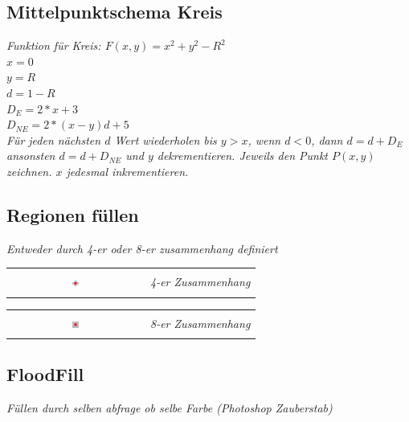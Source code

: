 \subsection{Mittelpunktschema Kreis}

\textit{Funktion für Kreis: $F(x,y) = x^2 + y^2 - R^2$}\\

$x = 0$\\
$y = R$\\
$d = 1 - R$\\
$D_{E} = 2*x + 3$\\
$D_{NE} = 2*(x-y)d + 5$\\

\textit{
    Für jeden nächsten $d$ Wert wiederholen bis $y > x$, wenn $d < 0$,
    dann $d = d + D_{E}$ ansonsten $d = d + D_{NE}$ und $y$ dekrementieren.
    Jeweils den Punkt $P(x,y)$ zeichnen. $x$ jedesmal inkrementieren.
}

\subsection{Regionen füllen}

\textit{Entweder durch 4-er oder 8-er zusammenhang definiert}

\begin{tabular}{cl}
    \multirow{3}{*}{
        \includegraphics[width=0.05\textwidth]{assets/region-filling-4.png}
    } & \\
    & \textit{4-er Zusammenhang} \\
    & \\
\end{tabular}
\begin{tabular}{cl}
    \multirow{3}{*}{
        \includegraphics[width=0.05\textwidth]{assets/region-filling-8.png}
    } & \\
    & \textit{8-er Zusammenhang} \\
    & \\
\end{tabular}

\subsection{FloodFill}

\textit{Füllen durch selben abfrage ob selbe Farbe (Photoshop Zauberstab)}

